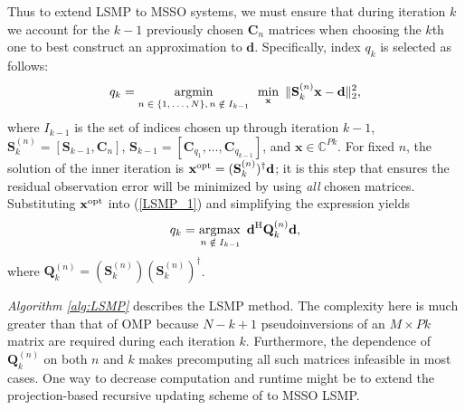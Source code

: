 \documentclass[final]{siamltex}
\newcommand{\field}[1]{\mathbb{#1}}
\newcommand{\la}[1]{\mbox{$\mathbf{#1}$}}  \newcommand{\sst}[1]{\mbox{\scriptsize{#1}}}
\begin{document}
    Thus to extend LSMP to MSSO systems, we must ensure that during
    iteration $k$ we account for the $k-1$ previously chosen $\la{C}_n$
    matrices when choosing the $k$th one to best construct an
    approximation to \la{d}.  Specifically, index $q_k$ is
    selected as follows:
    \begin{equation}\label{LSMP_1}
       q_k =
       \mathop{\mbox{argmin}}_{\mbox{\scriptsize{$n \in \{1, \ldots, N\}, n \notin I_{k-1}$}}} 
         \mbox{  }
       \mathop{\mbox{min}}_{\mbox{\scriptsize{$\la{x}$}}}   
         \mbox{  }
       \Vert \la{S}_{k}^{(n)} \la{x} - \la{d} \Vert_2^2,
    \end{equation}
    where $I_{k-1}$ is the set of indices chosen up through iteration
    $k-1$, $\la{S}_k^{(n)} = [\la{S}_{k-1}, \la{C}_n]$, $\la{S}_{k-1}
    = [ \la{C}_{q_1}, \ldots, \la{C}_{q_{k-1}} ]$, and $\la{x} \in
    \field{C}^{Pk}$.  For fixed $n$, the solution of the inner
    iteration is $\la{x}^{\sst{opt}} = (\la{S}_k^{(n)})^{\dagger}
    \la{d}$; it is this step that ensures the residual observation
    error will be minimized by using {\em{all}} chosen matrices.
    Substituting $\la{x}^{\sst{opt}}$ into (\ref{LSMP_1}) and
    simplifying the expression yields 
    \begin{equation}\label{LSMP_2}
       q_k = \mathop{\mbox{argmax}}_{\,\mbox{\scriptsize{$n \notin I_{k-1}$}}}
         \mbox{ } \la{d}^{\sst{H}} \la{Q}_k^{(n)} \la{d},
    \end{equation}
    where $\la{Q}_k^{(n)} = (\la{S}_k^{(n)})(\la{S}_k^{(n)})^{\dagger}$.
    
    {\em{Algorithm \ref{alg:LSMP}}} describes the LSMP method.  The
    complexity here is much greater than that of OMP because $N-k+1$
    pseudoinversions of an $M \times Pk$ matrix are required during each
    iteration $k$.  Furthermore, the dependence of $\la{Q}_k^{(n)}$ on
    both $n$ and $k$ makes precomputing all such matrices infeasible
    in most cases.  One way to decrease computation and runtime might
    be to extend the projection-based recursive updating scheme of
    \cite{Cot1999} to MSSO LSMP\@.
\end{document}
